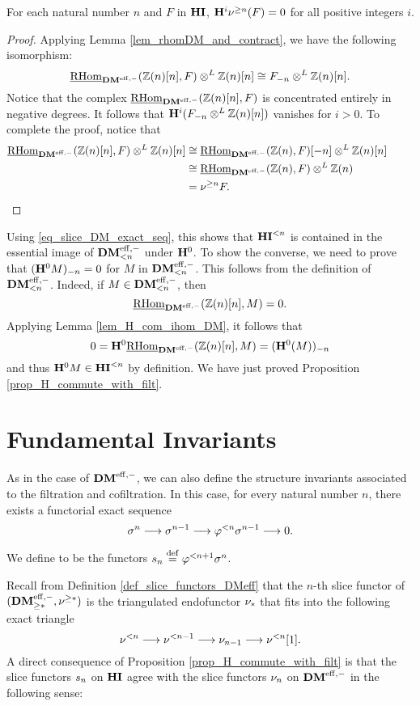 \begin{lem}\label{lem_H1_sgDM_vanishes}
For each natural number $n$ and $F$ in $\HI$, $\HH^i \sgDM{n}(F) 
= 0$ for all positive integers $i$.
\end{lem}
\begin{proof}
Applying Lemma \ref{lem_rhomDM_and_contract}, we have the following
isomorphism:
\[
\ihomDMf(\Z(n)[n], F) \tDM \Z(n)[n] \cong \RHI[n]{F} \tDM \Z(n)[n].
\] 
Notice that the complex $\ihomDMf(\Z(n)[n], F)$
is concentrated entirely in negative degrees. It follows that 
$\HH^i(\RHI[n]{F} \tDM \Z(n)[n])$ vanishes for $i > 0$. To complete
the proof, notice that
\begin{align*}
\ihomDMf(\Z(n)[n], F) \tDM \Z(n)[n] &\cong
\ihomDMf(\Z(n), F)[-n] \tDM \Z(n)[n] \\
&\cong \ihomDMf(\Z(n), F) \tDM \Z(n) \\
&= \sgDM{n} F.  &\phantom{aai}\qedhere
\end{align*}
\end{proof}

Using \eqref{eq_slice_DM_exact_seq}, this shows that $\TFHI{n}$ is 
contained in the essential image of $\LFiltDM[n]{\DMeff}$ under 
$\HH^0$. To show the converse, we need to prove that 
$\RHI[n]{(\HH^0 M)} = 0$ for $M$ in $\LFiltDM[n]{\DMeff}$. This 
follows from the definition of $\LFiltDM[n]{\DMeff}$. Indeed, if 
$M \in \LFiltDM[n]{\DMeff}$, then 
\[
\ihomDMf(\Z(n)[n], M) = 0.
\] 
Applying Lemma \ref{lem_H_com_ihom_DM}, it follows that
\[
0 = \HH^0\ihomDMf(\Z(n)[n], M) = \RHI[n]{(\HH^0(M))}
\]
and thus $\HH^0 M \in \TFHI{n}$ by definition. We have just proved 
Proposition \ref{prop_H_commute_with_filt}.

\section{Fundamental Invariants}

As in the case of $\DMeff$, we can also define the structure 
invariants associated to the filtration and cofiltration. In this
case, for every natural number $n$, there exists a functorial 
exact sequence
\[
\sgHI{n} \to \sgHI{n - 1} \to \tlHI{n}\sgHI{n - 1} \to 0.
\]
\begin{defn}
We define  to be the functors 
$\slice{n} \defeq \tlHI{n + 1}\sgHI{n}$. 
\end{defn}

Recall from Definition \ref{def_slice_functors_DMeff} that the 
$n$-th slice functor of $(\GFiltDM{\DMeff}, 
\sgDM{*})$ is the triangulated endofunctor $\sliceDM{*}$ that
fits into the following exact triangle
\[
\slDM{n} \to \slDM{n - 1} \to \sliceDM{n - 1} \to \slDM{n}[1].
\]
A direct consequence of Proposition \ref{prop_H_commute_with_filt} is 
that the slice functors $\slice{n}$ on $\HI$ agree 
with the slice functors $\sliceDM{n}$ on $\DMeff$ in the following
sense:

